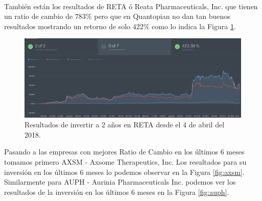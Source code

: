 \documentclass[10pt,a4paper,twocolumn]{article}
\begin{document}
		\\
		También están los resultados de RETA ó Reata Pharmaceuticals, Inc. que tienen un ratio de cambio de $783\% $ pero que en Quantopian no dan tan buenos resultados mostrando un retorno de solo $422\% $  como lo indica la Figura \ref{fig:reta}.\\
	
		\begin{figure}
			\centering
			\includegraphics[width=1.0\linewidth]{RETA}
			\caption{Resultados de invertir a 2 años en RETA desde el 4 de abril del 2018.}
			\label{fig:reta}
		\end{figure}
	Pasando a las empresas con mejores Ratio de Cambio en los últimos 6 meses tomamos primero AXSM - Axsome Therapeutics, Inc.  Los resultados para su inversión en los últimos 6 meses lo podemos observar en la Figura \ref{fig:axsm}. Similarmente para AUPH - Aurinia Pharmaceuticals Inc. podemos ver los resultados de la inversión en los últimos 6 meses en la Figura \ref{fig:auph}.\\
	
\end{document}
